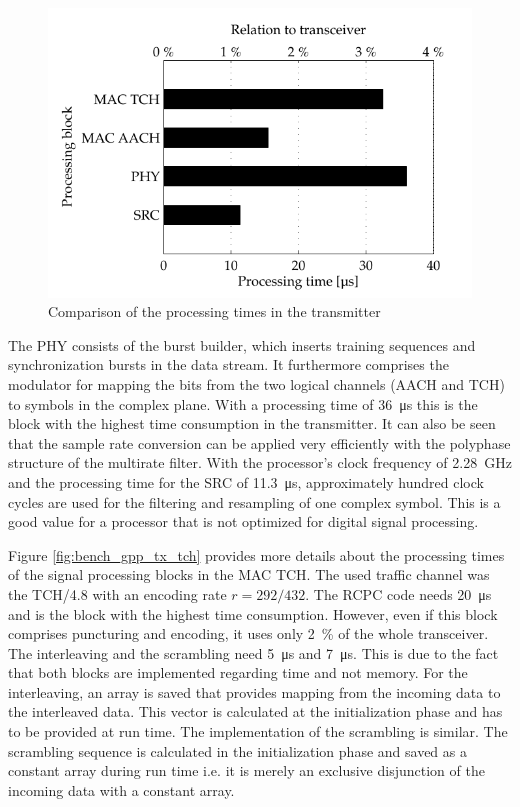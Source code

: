 \begin{figure}[htb]
	\centering
		\includegraphics{../kapitel05/figures/bench_gpp_tx.pdf}
	\caption{Comparison of the processing times in the transmitter}
	\label{fig:bench_gpp_tx}
\end{figure}


The \ac{PHY} consists of the burst builder, which inserts training sequences and synchronization bursts in the data stream. It furthermore comprises the modulator for mapping the bits from the two logical channels (AACH and TCH) to symbols in the complex plane. With a processing time of \SI{36}{\micro s} this is the block with the highest time consumption in the transmitter. It can also be seen that the sample rate conversion can be applied very efficiently with the polyphase structure of the multirate filter. With the processor's clock frequency of \SI{2.28}{GHz} and the processing time for the \ac{SRC} of \SI{11.3}{\micro s}, approximately hundred clock cycles are used for the filtering and resampling of one complex symbol. This is a good value for a processor that is not optimized for digital signal processing. 

Figure \ref{fig:bench_gpp_tx_tch} provides more details about the processing times of the signal processing blocks in the MAC TCH. The used traffic channel was the TCH/4.8 with an encoding rate $r = 292/432$. The \ac{RCPC} code needs \SI{20}{\micro s} and is the block with the highest time consumption. However, even if this block comprises puncturing and encoding, it uses only \SI{2}{\%} of the whole transceiver. The interleaving and the scrambling need \SI{5}{\micro s} and \SI{7}{\micro s}. This is due to the fact that both blocks are implemented regarding time and not memory. For the interleaving, an array is saved that provides mapping from the incoming data to the interleaved data. This vector is calculated at the initialization phase and has to be provided at run time. The implementation of the scrambling is similar. The scrambling sequence is calculated in the initialization phase and saved as a constant array during run time i.e. it is merely an exclusive disjunction of the incoming data with a constant array.

